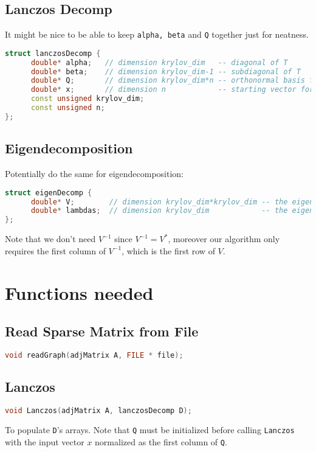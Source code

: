 \documentclass[a4paper, fleqn]{article}
\begin{document}
\subsection{Lanczos Decomp}%
\label{sub:lanczos_decomp}
It might be nice to be able to keep \texttt{alpha, beta} and \texttt{Q} together just for neatness.  
\begin{lstlisting}[language = C++]
struct lanczosDecomp {
      double* alpha;   // dimension krylov_dim   -- diagonal of T
      double* beta;    // dimension krylov_dim-1 -- subdiagonal of T
      double* Q;       // dimension krylov_dim*n -- orthonormal basis for Krylov subspace
      double* x;       // dimension n            -- starting vector for Krylov subspace
      const unsigned krylov_dim;
      const unsigned n;
};
\end{lstlisting}

\subsection{Eigendecomposition}%
\label{sub:eig_decomp}
Potentially do the same for eigendecomposition:
\begin{lstlisting}[language = C++]
struct eigenDecomp {
      double* V;        // dimension krylov_dim*krylov_dim -- the eigenvectors of T
      double* lambdas;  // dimension krylov_dim            -- the eigenvalues of T
};
\end{lstlisting}
Note that we don't need $V^{-1}$ since $V^{-1} = V^*$, moreover our algorithm only requires the first column of $V^{-1}$, which is the first row of $V$.

\section{Functions needed}%
\label{sec:functions_needed}
\subsection{Read Sparse Matrix from File}%
\label{sub:read_sparse_matrix_from_file}
\begin{lstlisting}[language = C++]
void readGraph(adjMatrix A, FILE * file);
\end{lstlisting}


\subsection{ Lanczos }
\begin{lstlisting}[language = C++]
void Lanczos(adjMatrix A, lanczosDecomp D);
\end{lstlisting}
\label{sub:Lanczos}
To populate \texttt{D}'s arrays. Note that \texttt{Q} must be initialized before calling \texttt{Lanczos} with the input vector $x$ normalized as the first column of  \texttt{Q}.
\end{document}
